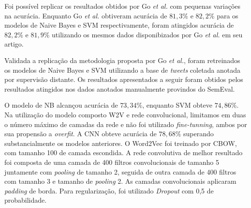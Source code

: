Foi possível replicar os resultados obtidos por Go \textit{et al.} com pequenas variações na acurácia.
Enquanto Go \textit{et al.} obtiveram acurácia de $81,3\%$ e $82,2\%$ para os modelos de Naive Bayes e SVM
respectivamente, foram atingidos acurácia de $82,2\%$ e $81,9\%$ utilizando os mesmos dados disponibizados por Go
\textit{et al.} em seu artigo.

Validada a replicação da metodologia proposta por Go \textit{et al.}, foram retreinados os modelos de Naive Bayes e SVM
utilizando a base de \textit{tweets} coletada anotada por supervisão distante.
Os resultados apresentados a seguir foram obtidos pelos resultados atingidos nos dados anotados manualmente provindos do
SemEval.

O modelo de NB alcançou acurácia de $73,34\%$, enquanto SVM obteve $74,86\%$.
Na utilização do modelo composto W2V e rede convolucional, limitamos em duas o número máximo de camadas da rede e não
foi utilizado \textit{fine-tunning}, ambos por sua propensão a \textit{overfit}.
A CNN obteve acurácia de $78,68\%$ superando substancialmente os modelos anteriores.
O Word2Vec foi treinado por CBOW, com tamanho 100 de camada escondida.
A rede convolutiva de melhor resultado foi composta de uma camada de 400 filtros convolucionais de tamanho 5 juntamente
com \textit{pooling} de tamanho 2, seguida de outra camada de 400 filtros com tamanho 3 e tamanho de \textit{pooling} 2.
As camadas convolucionais aplicaram \textit{padding} de borda.
Para regularização, foi utilizado \textit{Dropout} com 0,5 de probabilidade.

